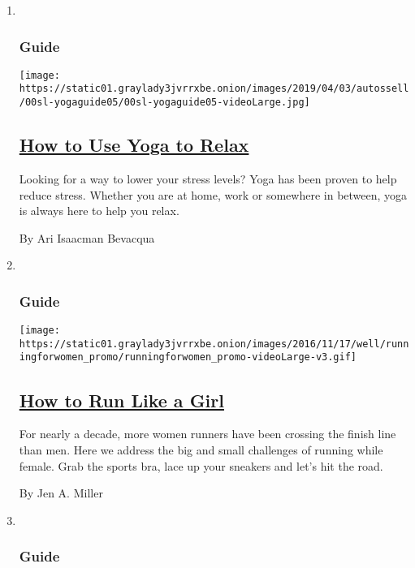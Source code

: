 \begin{enumerate}
\def\labelenumi{\arabic{enumi}.}
\item ~
  \hypertarget{guide}{%
  \subsubsection{Guide}\label{guide}}

  \texttt{[image: https://static01.graylady3jvrrxbe.onion/images/2019/04/03/autossell/00sl-yogaguide05/00sl-yogaguide05-videoLarge.jpg]}

  \hypertarget{how-to-use-yoga-to-relax}{%
  \subsection{\texorpdfstring{\href{/interactive/2018/well/how-to-use-yoga-to-relax.html}{How
  to Use Yoga to
  Relax}}{How to Use Yoga to Relax}}\label{how-to-use-yoga-to-relax}}

  Looking for a way to lower your stress levels? Yoga has been proven to
  help reduce stress. Whether you are at home, work or somewhere in
  between, yoga is always here to help you relax.

  By Ari Isaacman Bevacqua
\item ~
  \hypertarget{guide-1}{%
  \subsubsection{Guide}\label{guide-1}}

  \texttt{[image: https://static01.graylady3jvrrxbe.onion/images/2016/11/17/well/runningforwomen\_promo/runningforwomen\_promo-videoLarge-v3.gif]}

  \hypertarget{how-to-run-like-a-girl}{%
  \subsection{\texorpdfstring{\href{/interactive/2016/well/move/well-runningforwomen-guide-interactive.html}{How
  to Run Like a
  Girl}}{How to Run Like a Girl}}\label{how-to-run-like-a-girl}}

  For nearly a decade, more women runners have been crossing the finish
  line than men. Here we address the big and small challenges of running
  while female. Grab the sports bra, lace up your sneakers and let's hit
  the road.

  By Jen A. Miller
\item ~
  \hypertarget{guide-2}{%
  \subsubsection{Guide}\label{guide-2}}


\end{enumerate}
